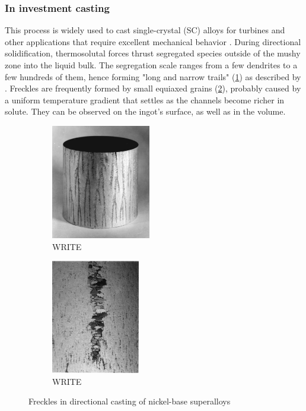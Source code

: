 \subsubsection*{In investment casting}
This process is widely used to cast single-crystal (SC) alloys for turbines and other applications that require excellent mechanical behavior \citep{giamei_nature_1970}.
During directional solidification, thermosolutal forces thrust segregated species outside of the mushy zone into the liquid bulk.
The segregation scale ranges from a few dendrites to a few hundreds of them, hence forming "long and narrow trails" (\cref{fig:freckle1}) as described by \citet{felicelli_simulation_1991}. Freckles are frequently formed by small equiaxed grains (\cref{fig:freckle2}), probably caused by a uniform temperature gradient 
that settles as the channels become richer in solute. They can be observed on the ingot's surface, as well as in the volume.
\begin{figure}[htbp]
\centering
  \begin{subfigure}[t]{0.25\textwidth}
    \centering
	\includegraphics[height=5cm]{Chapter0/Graphics/freckle1.png}
	\caption{WRITE}
    \label{fig:freckle1}
  \end{subfigure}
   \qquad %
   \begin{subfigure}[t]{0.25\textwidth}
    \centering
	\includegraphics[height=5cm]{Chapter0/Graphics/freckle2.png}
	\caption{WRITE}
    \label{fig:freckle2}
  \end{subfigure}
\caption{Freckles in directional casting of nickel-base superalloys} 
\label{fig:freckle}
\end{figure}
